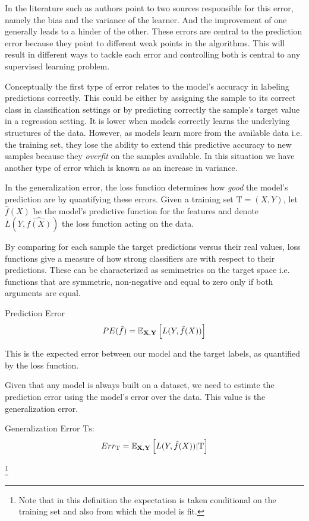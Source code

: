 In the literature such as \textcite{james-biasVarianceGeneral} authors point to two sources responsible for this error, namely the bias and the variance of the learner. And the improvement of one generally leads to a hinder of the other. These errors are central to the prediction error because they point to different weak points in the algorithms. This will result in different ways to tackle each error and controlling both is central to any supervised learning problem.

Conceptually the first type of error relates to the model's accuracy in labeling predictions correctly. This could be either by assigning the sample to its correct class in classification settings or by predicting correctly the sample's target value in a regression setting. It is lower when models correctly learns the underlying structures of the data. However, as models learn more from the available data i.e. the training set, they lose the ability to extend this predictive accuracy to new samples because they \textit{overfit} on the samples available. In this situation we have another type of error which is known as an increase in variance.

In the generalization error, the loss function  determines how \textit{good} the model's prediction are by quantifying these errors. Given a training set $\mathrm{T} = (X,Y)$, let $\hat{f}(X)$ be the model's predictive function for the features and denote $L( Y,\hat{f(X)} )$ the loss function acting on the data.

By comparing for each sample the target predictions versus their real values, loss functions give a measure of how strong classifiers are with respect to their predictions. These can be characterized as semimetrics on the target space i.e. functions that are symmetric, non-negative and equal to zero only if both arguments are equal.

\begin{definition}{Prediction Error}
$$ PE(\hat{f})= \operatorname{\mathbb{E}}_{\textbf{X},\textbf{Y}} \left[ L(Y,\hat{f}(X))\right]$$
\end{definition}

This is the expected error between our model and the target labels, as quantified by the loss function.

Given that any model is always built on a dataset, we need to estimte the prediction error using the model's error over the data.  This value is the generalization error.

\begin{definition}{Generalization Error}
 $\mathrm{Ts}$:
$$ Err_{\mathrm{T}} =  \operatorname{\mathbb{E}}_{\textbf{X},\textbf{Y}} \left[ L(Y,\hat{f}(X)) |  \mathrm{T}\right]$$
\end{definition}\footnote{Note that in this definition the expectation is taken conditional on the training set and also from which the model is fit.}

